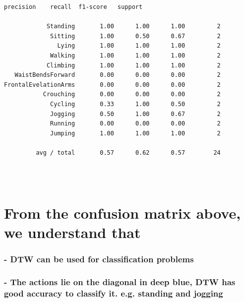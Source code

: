 \documentclass[11pt]{article}
\begin{document}
    \begin{Verbatim}[commandchars=\\\{\}]
                      precision    recall  f1-score   support

            Standing       1.00      1.00      1.00         2
             Sitting       1.00      0.50      0.67         2
               Lying       1.00      1.00      1.00         2
             Walking       1.00      1.00      1.00         2
            Climbing       1.00      1.00      1.00         2
   WaistBendsForward       0.00      0.00      0.00         2
FrontalEvelationArms       0.00      0.00      0.00         2
           Crouching       0.00      0.00      0.00         2
             Cycling       0.33      1.00      0.50         2
             Jogging       0.50      1.00      0.67         2
             Running       0.00      0.00      0.00         2
             Jumping       1.00      1.00      1.00         2

         avg / total       0.57      0.62      0.57        24


    \end{Verbatim}

    \begin{center}
    \end{center}
    { \hspace*{\fill} \\}
    
    \section{From the confusion matrix above, we understand
that}\label{from-the-confusion-matrix-above-we-understand-that}

\subsubsection{- DTW can be used for classification
problems​}\label{dtw-can-be-used-for-classification-problems}

\subsubsection{- The actions lie on the diagonal in deep blue, DTW has
good accuracy to classify it. e.g. standing and
jogging}\label{the-actions-lie-on-the-diagonal-in-deep-blue-dtw-has-good-accuracy-to-classify-it.-e.g.-standing-and-jogging}
\end{document}
